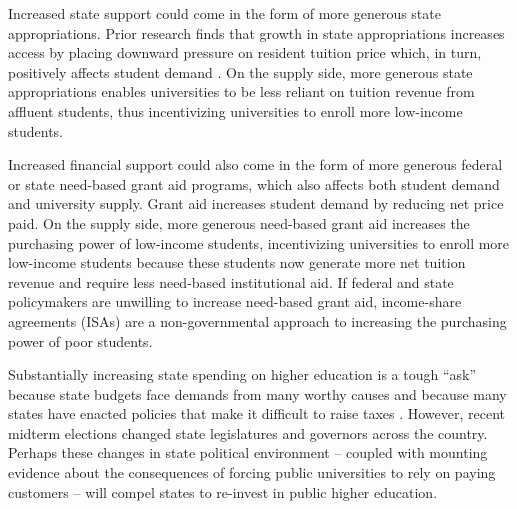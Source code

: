 \documentclass[twoside]{article}
\begin{document}
Increased state support could come in the form of more generous state appropriations.  Prior research finds that growth in state appropriations increases access by placing downward pressure on resident tuition price \citep{RN2609} which, in turn, positively affects student demand \citep{RN3068}.  On the supply side, more generous state appropriations enables universities to be less reliant on tuition revenue from affluent students, thus incentivizing universities to enroll more low-income students.

Increased financial support could also come in the form of more generous federal or state need-based grant aid programs, which also affects both student demand and university supply. Grant aid increases student demand by reducing net price paid.  On the supply side, more generous need-based grant aid increases the purchasing power of low-income students, incentivizing universities to enroll more low-income students because these students now generate more net tuition revenue and require less need-based institutional aid. If federal and state policymakers are unwilling to increase need-based grant aid, income-share agreements (ISAs) are a non-governmental approach to increasing the purchasing power of poor students.

Substantially increasing state spending on higher education is a tough ``ask'' because state budgets face demands from many worthy causes \citep{RN1652} and because many states have enacted policies that make it difficult to raise taxes \citep{RN1646}.  However, recent midterm elections changed state legislatures and governors across the country.  Perhaps these changes in state political environment -- coupled with mounting evidence about the consequences of forcing public universities to rely on paying customers -- will compel states to re-invest in public higher education.
\end{document}
